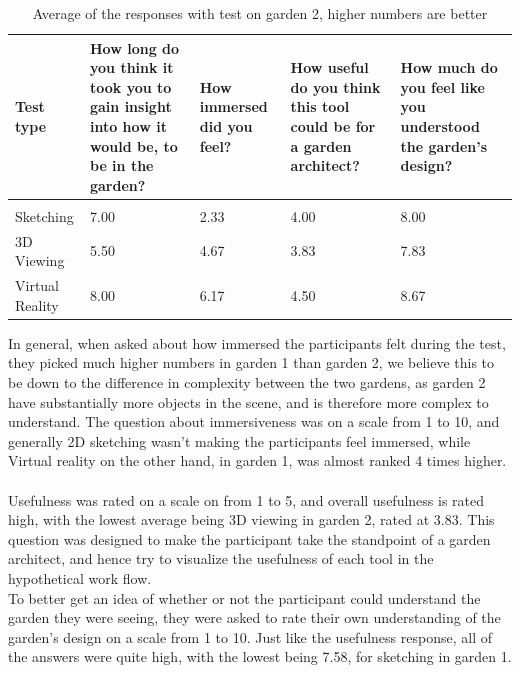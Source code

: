 \begin{table}[H]
	\centering
	\caption{Average of the responses with test on garden 2, higher numbers are better}
	\label{table:averageResponseGarden2}
	\begin{tabular}{p{3cm}|p{3cm}|p{2cm}|p{3cm}|p{3cm}}
		Test type       & How long do you think it took you to gain insight into how it would be, to be in the garden? & How immersed did you feel? & How useful do you think this tool could be for a garden architect? & How much do you feel like you understood the garden's design? \\ \hline
		&&&&\\
		Sketching       & 7.00                                                                                         & 2.33                       & 4.00                                                               & 8.00                                                          \\
		3D Viewing      & 5.50                                                                                         & 4.67                       & 3.83                                                               & 7.83                                                          \\
		
		Virtual Reality & 8.00                                                                                         & 6.17                       & 4.50                                                               & 8.67                                                         
	\end{tabular}
\end{table}

In general, when asked about how immersed the participants felt during the test, they picked much higher numbers in garden 1 than garden 2, we believe this to be down to the difference in complexity between the two gardens, as garden 2 have substantially more objects in the scene, and is therefore more complex to understand.
The question about immersiveness was on a scale from 1 to 10, and generally 2D sketching wasn't making the participants feel immersed, while Virtual reality on the other hand, in garden 1, was almost ranked 4 times higher.\\\\

Usefulness was rated on a scale on from 1 to 5, and overall usefulness is rated high, with the lowest average being 3D viewing in garden 2, rated at 3.83. This question was designed to make the participant take the standpoint of a garden architect, and hence try to visualize the usefulness of each tool in the hypothetical work flow.\\
To better get an idea of whether or not the participant could understand the garden they were seeing, they were asked to rate their own understanding of the garden's design on a scale from 1 to 10. Just like the usefulness response, all of the answers were quite high, with the lowest being 7.58, for sketching in garden 1.\\


